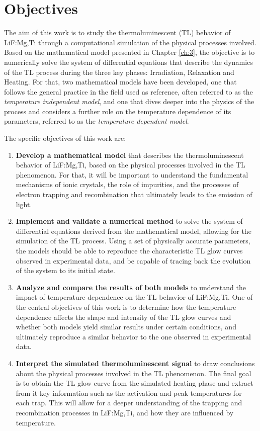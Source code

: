 \chapter{Objectives}\label{ch:2}

The aim of this work is to study the thermoluminescent (TL) behavior of LiF:Mg,Ti through a computational simulation of the physical processes involved. Based on the mathematical model presented in Chapter \ref{ch:3}, the objective is to numerically solve the system of differential equations that describe the dynamics of the TL process during the three key phases: Irradiation, Relaxation and Heating. For that, two mathematical models have been developed, one that follows the general practice in the field used as reference, often referred to as the \textit{temperature independent model}, and one that dives deeper into the physics of the process and considers a further role on the temperature dependence of its parameters, referred to as the \textit{temperature dependent model}.

\vspace{10pt}

The specific objectives of this work are:
\begin{enumerate}[label=\textbf{\arabic*.}, font=\bfseries]
    \item \textbf{Develop a mathematical model} that describes the thermoluminescent behavior of LiF:Mg,Ti, based on the physical processes involved in the TL phenomenon. For that, it will be important to understand the fundamental mechanisms of ionic crystals, the role of impurities, and the processes of electron trapping and recombination that ultimately leads to the emission of light.
    \item \textbf{Implement and validate a numerical method} to solve the system of differential equations derived from the mathematical model, allowing for the simulation of the TL process. Using a set of physically accurate parameters, the models should be able to reproduce the characteristic TL glow curves observed in experimental data, and be capable of tracing back the evolution of the system to its initial state.
    \item \textbf{Analyze and compare the results of both models} to understand the impact of temperature dependence on the TL behavior of LiF:Mg,Ti. One of the central objectives of this work is to determine how the temperature dependence affects the shape and intensity of the TL glow curves and whether both models yield similar results under certain conditions, and ultimately reproduce a similar behavior to the one observed in experimental data.
    \item \textbf{Interpret the simulated thermoluminescent signal} to draw conclusions about the physical processes involved in the TL phenomenon. The final goal is to obtain the TL glow curve from the simulated heating phase and extract from it key information such as the activation and peak temperatures for each trap. This will allow for a deeper understanding of the trapping and recombination processes in LiF:Mg,Ti, and how they are influenced by temperature.
\end{enumerate}

